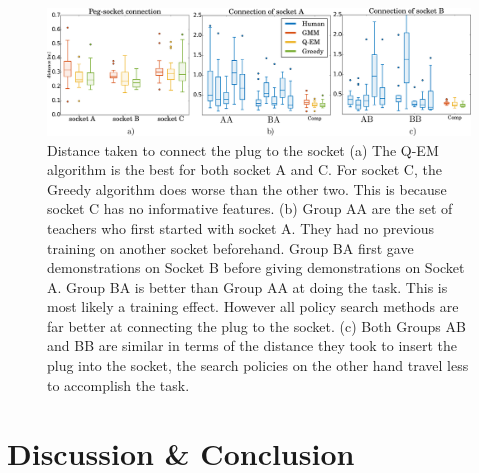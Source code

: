 \documentclass[final,5p,times,twocolumn]{elsarticle}
\begin{document}
\begin{figure}
 \centering
   \includegraphics[width=\linewidth]{./Figure/real_socket_human_all.pdf}
  \caption{ Distance taken to connect the plug to the socket (a) The Q-EM algorithm is the best for both socket A and C. 
  For socket C, the Greedy algorithm does worse than the other two. This is because socket C has no informative features. 
  (b) Group AA are the set of teachers who first started with socket A. They had no previous training on another socket beforehand. Group 
  BA first gave demonstrations on Socket B before giving demonstrations on Socket A. Group BA
  is better than Group AA at doing the task. This is most likely a training effect. However all policy search methods are far better
  at connecting the plug to the socket. (c) Both Groups AB and BB are similar in terms   of the distance they took to 
  insert the plug into the socket, the search policies on the other hand travel less to accomplish the task.   } 
  \label{fig:real_statistics}
\end{figure}


\section{Discussion \& Conclusion}\label{sec:conclusion}
\end{document}
